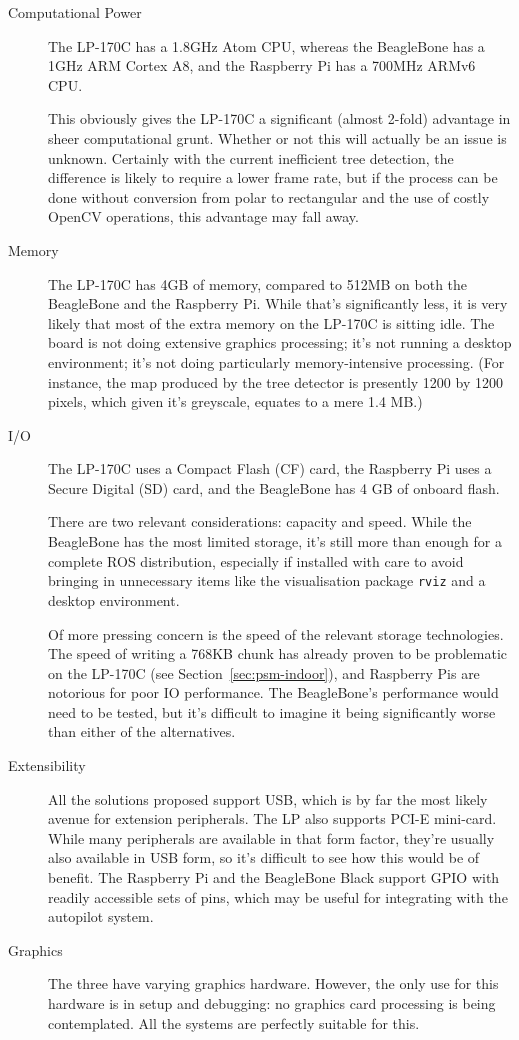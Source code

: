 \documentclass[12pt,oneside,a4paper]{book}
\begin{document}
\begin{description}
\item[Computational Power] The LP-170C has a 1.8GHz Atom CPU, whereas
  the BeagleBone has a 1GHz ARM Cortex A8, and the Raspberry Pi has a
  700MHz ARMv6 CPU.

  This obviously gives the LP-170C a significant (almost 2-fold)
  advantage in sheer computational grunt. Whether or not this will
  actually be an issue is unknown. Certainly with the current
  inefficient tree detection, the difference is likely to require a
  lower frame rate, but if the process can be done without conversion
  from polar to rectangular and the use of costly OpenCV operations,
  this advantage may fall away.
\item[Memory] The LP-170C has 4GB of memory, compared to 512MB on both
  the BeagleBone and the Raspberry Pi. While that's significantly
  less, it is very likely that most of the extra memory on the LP-170C is sitting
  idle. The board is not doing extensive graphics processing; it's not
  running a desktop environment; it's not doing particularly
  memory-intensive processing. (For instance, the map produced by the
  tree detector is presently 1200 by 1200 pixels, which given it's
  greyscale, equates to a mere 1.4 MB.)
\item[I/O] The LP-170C uses a Compact Flash (CF) card, the Raspberry
  Pi uses a Secure Digital (SD) card, and the BeagleBone has 4 GB of
  onboard flash.

  There are two relevant considerations: capacity and speed. While the
  BeagleBone has the most limited storage, it's still more than enough
  for a complete ROS distribution, especially if installed with care
  to avoid bringing in unnecessary items like the visualisation
  package \texttt{rviz} and a desktop environment.

  Of more pressing concern is the speed of the relevant storage
  technologies. The speed of writing a 768KB chunk has already proven
  to be problematic on the LP-170C (see Section~\ref{sec:psm-indoor}),
  and Raspberry Pis are notorious for poor IO performance. The
  BeagleBone's performance would need to be tested, but it's difficult
  to imagine it being significantly worse than either of the
  alternatives.
\item[Extensibility] All the solutions proposed support USB, which is
  by far the most likely avenue for extension peripherals. The LP also
  supports PCI-E mini-card. While many peripherals are available in
  that form factor, they're usually also available in USB form, so
  it's difficult to see how this would be of benefit. The Raspberry Pi
  and the BeagleBone Black support GPIO with readily accessible sets
  of pins, which may be useful for integrating with the autopilot
  system.
\item[Graphics] The three have varying graphics hardware. However, the
  only use for this hardware is in setup and debugging: no graphics
  card processing is being contemplated. All the systems are perfectly
  suitable for this.
\end{description}
\end{document}
